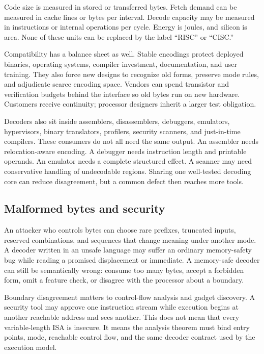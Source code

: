 \begin{keyidea}[title={The unit of cost must be named}]
Code size is measured in stored or transferred bytes. Fetch demand can be
measured in cache lines or bytes per interval. Decode capacity may be measured
in instructions or internal operations per cycle. Energy is joules, and
silicon is area. None of these units can be replaced by the label ``RISC'' or
``CISC.''
\end{keyidea}

Compatibility has a balance sheet as well. Stable encodings protect deployed
binaries, operating systems, compiler investment, documentation, and user
training. They also force new designs to recognize old forms, preserve mode
rules, and adjudicate scarce encoding space. Vendors can spend transistor and
verification budgets behind the interface so old bytes run on new hardware.
Customers receive continuity; processor designers inherit a larger test obligation.

Decoders also sit inside assemblers, disassemblers, debuggers, emulators,
hypervisors, binary translators, profilers, security scanners, and
just-in-time compilers. These consumers do not all need the same output. An
assembler needs relocation-aware encoding. A debugger needs instruction
length and printable operands. An emulator needs a complete structured effect.
A scanner may need conservative handling of undecodable regions. Sharing one
well-tested decoding core can reduce disagreement, but a common defect then
reaches more tools.

\subsection{Malformed bytes and security}

An attacker who controls bytes can choose rare prefixes, truncated inputs,
reserved combinations, and sequences that change meaning under another mode.
A decoder written in an unsafe language may suffer an ordinary memory-safety
bug while reading a promised displacement or immediate. A memory-safe decoder
can still be semantically wrong: consume too many bytes, accept a forbidden
form, omit a feature check, or disagree with the processor about a boundary.

Boundary disagreement matters to control-flow analysis and gadget discovery.
A security tool may approve one instruction stream while execution begins at
another reachable address and sees another. This does not mean that every
variable-length ISA is insecure. It means the analysis theorem must bind entry
points, mode, reachable control flow, and the same decoder contract used by
the execution model.

